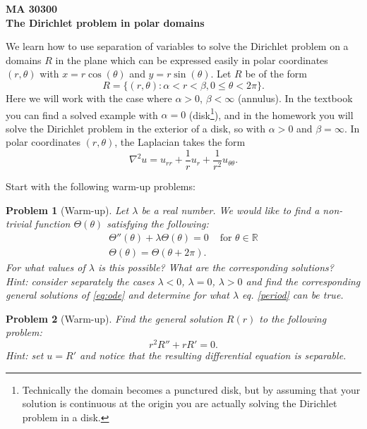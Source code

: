 \documentclass[11pt]{article}
\title{}
\author{Nikolas Eptaminitakis}
\newcommand{\R}{\mathbb{R}}
\renewcommand{\a}{\alpha}
\renewcommand{\b}{\beta}
\renewcommand{\l}{\lambda}
\renewcommand{\th}{\theta}
\newtheorem{problem}{Problem}
\begin{document}
\noindent
\Large
\textbf
{MA 30300\\
The Dirichlet problem in polar domains}

\medskip

\normalsize


\noindent We learn how to use separation of variables to solve the Dirichlet problem on a domains $R$ in the plane which can be expressed easily in polar coordinates $(r,\th)$ with $x=r \cos(\th)$ and $y=r\sin(\th)$.
Let $R$ be of the form 
\begin{equation}
    R=\{(r,\theta):\alpha <r<\b , 0\leq \theta <2\pi \}.
\end{equation}
Here we will work with the case where $\a>0$, $\b<\infty$ (annulus). In the textbook you can find a solved example with $\a=0$ (disk\footnote{Technically the domain becomes a punctured disk, but by assuming that your solution is continuous at the origin you are actually solving the Dirichlet problem in a disk.}), and in the homework you will solve the Dirichlet problem in the exterior of a disk, so with $\a>0$ and $\b=\infty$.
In polar coordinates $(r,\theta)$, the Laplacian takes the form
\begin{equation}
    \nabla^2u=u_{rr}+\frac{1}{r}u_r+\frac{1}{r^2}u_{\th\th}.
\end{equation}

\smallskip

Start with the following warm-up problems:

\begin{problem}[Warm-up]\label{prob:1}
Let $\l$ be a real number. 
We would like to find a non-trivial function $\Theta(\theta)$ satisfying the following:
    \begin{align}
        \Theta''(\th)+\l \Theta(\th)=0& \text{ for } \theta\in \R\label{eq:ode}\\
        \Theta(\th)=\Theta(\th+2\pi).&\label{period}
    \end{align}
For what values of $\l$ is this possible? What are the corresponding solutions?\\
Hint: consider separately the cases $\l<0$, $\l=0 $, $\l>0$ and find the corresponding general solutions of \eqref{eq:ode} and determine for what $\l$ eq. \eqref{period} can be true.
\end{problem}

\begin{problem}[Warm-up]
    Find the general solution $R(r)$ to the following problem:
    \begin{equation}
        r^2 R''+r R'=0.\label{eq:prob1}
    \end{equation}
    Hint: set $u=R'$ and notice that the resulting differential equation is separable.
\end{problem}
\end{document}
